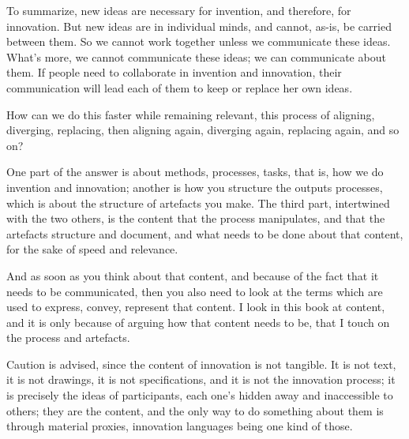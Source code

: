 \documentclass[graybox,envcountchap,sectrefs]{svmono}
\begin{document}
To summarize, new ideas are necessary for invention, and therefore, for innovation. But new ideas are in individual minds, and cannot, as-is, be carried between them. So we cannot work together unless we communicate these ideas. What's more, we cannot communicate these ideas; we can communicate about them. If people need to collaborate in invention and innovation, their communication will lead each of them to keep or replace her own ideas. 

How can we do this faster while remaining relevant, this process of aligning, diverging, replacing, then aligning again, diverging again, replacing again, and so on? 

One part of the answer is about methods, processes, tasks, that is, how we do invention and innovation; another is how you structure the outputs processes, which is about the structure of artefacts you make. The third part, intertwined with the two others, is the content that the process manipulates, and that the artefacts structure and document, and what needs to be done about that content, for the sake of speed and relevance. 

And as soon as you think about that content, and because of the fact that it needs to be communicated, then you also need to look at the terms which are used to express, convey, represent that content. I look in this book at content, and it is only because of arguing how that content needs to be, that I touch on the process and artefacts. 

Caution is advised, since the content of innovation is not tangible. It is not text, it is not drawings, it is not specifications, and it is not the innovation process; it is precisely the ideas of participants, each one's hidden away and inaccessible to others; they are the content, and the only way to do something about them is through material proxies, innovation languages being one kind of those.


\printbibliography
\end{document}
